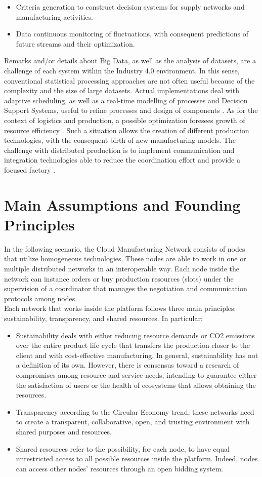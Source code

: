 \begin{itemize}
    \item Criteria generation to construct decision systems for supply networks and manufacturing activities.
    \item Data continuous monitoring of fluctuations, with consequent predictions of future streams and their optimization.
\end{itemize}
Remarks and/or details about Big Data, as well as the analysis of datasets, are a challenge of each system within the Industry 4.0 environment. In this sense, conventional statistical processing approaches are not often useful because of the complexity and the size of large datasets. Actual implementations deal with adaptive scheduling, as well as a real-time modelling of processes and Decision Support Systems, useful to refine processes and design of components \parencite{oliff_towards_2017}. As for the context of logistics and production, a possible optimization foresees growth of resource efficiency \parencite{hauder_optimization_2017}. Such a situation allows the creation of different production technologies, with the consequent birth of new manufacturing models. The challenge with distributed production is to implement communication and integration technologies able to reduce the coordination effort and provide a focused factory \parencite{khajavi_additive_2014}.
\section{Main Assumptions and Founding Principles}
In the following scenario, the Cloud Manufacturing Network consists of nodes that utilize homogeneous technologies. These nodes are able to work in one or multiple distributed networks in an interoperable way. Each node inside the network can instance orders or buy production resources (slots) under the supervision of a coordinator that manages the negotiation and communication protocols among nodes.\\
Each network that works inside the platform follows three main principles: sustainability, transparency, and shared resources. In particular:
\begin{itemize}
    \item Sustainability deals with either reducing resource demands or CO2 emissions over the entire product life cycle that transfers the production closer to the client and with cost-effective manufacturing. In general, sustainability has not a definition of its own. However, there is consensus toward a research of compromises among resource and service needs, intending to guarantee either the satisfaction of users or the health of ecosystems that allows obtaining the resources.
    \item Transparency according to the Circular Economy trend, these networks need to create a transparent, collaborative, open, and trusting environment with shared purposes and resources.
    \item Shared resources refer to the possibility, for each node, to have equal unrestricted access to all possible resources inside the platform. Indeed, nodes can access other nodes’ resources through an open bidding system.
\end{itemize}

